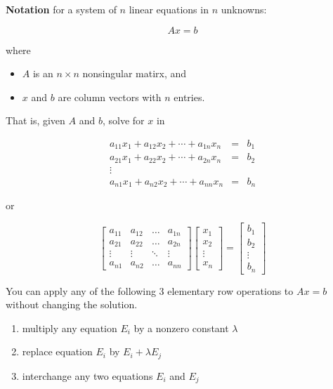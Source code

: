 \documentclass [titlepage,12pt,letter] {article}
\begin{document}
{\bf Notation} for a system of $n$ linear equations in $n$ unknowns:

\[
Ax=b
\]

\noindent
where

\begin{itemize}
\item{$A$ is an $n \times n$ nonsingular matirx, and}
\item{$x$ and $b$ are column vectors with $n$ entries.}
\end{itemize}

That is, given $A$ and $b$, solve for $x$ in

\begin{eqnarray*}
a_{11}x_1 +a_{12}x_2+ \dotsb +a_{1n}x_n &=&b_1 \\
a_{21}x_1 +a_{22}x_2+ \dotsb +a_{2n}x_n &=&b_2 \\
\vdots \\
a_{n1}x_1 +a_{n2}x_2+ \dotsb +a_{nn}x_n &=&b_n
\end{eqnarray*}

\noindent
or

\[
\begin{bmatrix}
    a_{11}       & a_{12} & \dots & a_{1n} \\
    a_{21}       & a_{22} & \dots & a_{2n} \\
    \vdots & \vdots & \ddots & \vdots \\
    a_{n1}       & a_{n2} & \dots & a_{nn}
\end{bmatrix}
\begin{bmatrix}
    x_{1} \\
    x_{2}  \\
    \vdots \\
    x_{n} 
\end{bmatrix}
=
\begin{bmatrix}
    b_{1} \\
    b_{2}  \\
    \vdots \\
    b_{n} 
\end{bmatrix}
\]


You can apply any of the following 3 elementary row operations to $Ax=b$ without
changing the solution.

\begin{enumerate}[i]
  \item multiply any equation $E_i$ by a nonzero constant $\lambda$
  \item replace equation $E_i$ by $E_i + \lambda E_j$
  \item interchange any two equations $E_i$ and $E_j$
\end{enumerate}
\end{document}
